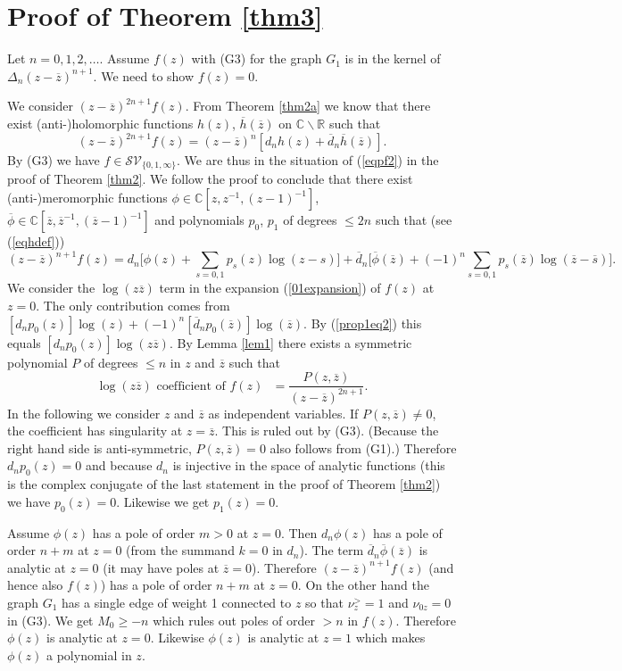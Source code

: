 \documentclass[oneside]{amsart}
\newcommand{\CC}{{\mathbb C}}
\newcommand{\RR}{{\mathbb R}}
\newcommand{\ddd}{{\overline{d}}}
\newcommand{\hh}{{\overline{h}}}
\newcommand{\sss}{{\overline{s}}}
\newcommand{\zz}{{\overline{z}}}
\newcommand{\sS}{\mathcal{S}}
\newcommand{\sV}{\mathcal{V}}
\theoremstyle{plain}
\begin{document}
\section{Proof of Theorem \ref{thm3}}\label{sectpf3}
Let $n=0,1,2,\ldots$. Assume $f(z)$ with (G3) for the graph $G_1$ is in the kernel of $\Delta_n(z-\zz)^{n+1}$. We need to show $f(z)=0$.

We consider $(z-\zz)^{2n+1}f(z)$. From Theorem \ref{thm2a} we know that there exist (anti-)holomorphic functions $h(z)$, $\hh(\zz)$ on $\CC\backslash\RR$ such that
\begin{equation}\label{pf3eq}
(z-\zz)^{2n+1}f(z)=(z-\zz)^n[d_nh(z)+\ddd_n\hh(\zz)].
\end{equation}
By (G3) we have $f\in\sS\sV_{\{0,1,\infty\}}$. We are thus in the situation of (\ref{eqpf2}) in the proof of Theorem \ref{thm2}.
We follow the proof to conclude that there exist (anti-)meromorphic functions $\phi\in\CC[z,z^{-1},(z-1)^{-1}]$, $\overline{\phi}\in\CC[\zz,\zz^{-1},(\zz-1)^{-1}]$
and polynomials $p_0$, $p_1$ of degrees $\leq2n$ such that (see (\ref{eqhdef}))
$$
(z-\zz)^{n+1}f(z)=d_n\Big[\phi(z)+\sum_{s=0,1}p_s(z)\log(z-s)\Big]+\ddd_n\Big[\overline{\phi}(\zz)+(-1)^n\sum_{s=0,1}p_s(\zz)\log(\zz-\sss)\Big].
$$
We consider the $\log(z\zz)$ term in the expansion (\ref{01expansion}) of $f(z)$ at $z=0$. The only contribution comes from
$[d_np_0(z)]\log(z)+(-1)^n[\ddd_np_0(\zz)]\log(\zz)$. By (\ref{prop1eq2}) this equals $[d_np_0(z)]\log(z\zz)$.
By Lemma \ref{lem1} there exists a symmetric polynomial $P$ of degrees $\leq n$ in $z$ and $\zz$ such that
$$
\text{$\log(z\zz)$ coefficient of $f(z)$ }=\frac{P(z,\zz)}{(z-\zz)^{2n+1}}.
$$
In the following we consider $z$ and $\zz$ as independent variables. If $P(z,\zz)\neq0$, the coefficient has singularity at $z=\zz$. This is ruled out by (G3).
(Because the right hand side is anti-symmetric, $P(z,\zz)=0$ also follows from (G1).)
Therefore $d_np_0(z)=0$ and because $d_n$ is injective in the space of analytic functions (this is the complex conjugate of the last statement in the proof
of Theorem \ref{thm2}) we have $p_0(z)=0$. Likewise we get $p_1(z)=0$.

Assume $\phi(z)$ has a pole of order $m>0$ at $z=0$. Then $d_n\phi(z)$ has a pole of order $n+m$ at $z=0$ (from the summand $k=0$ in $d_n$).
The term $\ddd_n\overline{\phi}(\zz)$ is analytic at $z=0$ (it may have poles at $\zz=0$). Therefore $(z-\zz)^{n+1}f(z)$ (and hence also $f(z)$) has a pole of order $n+m$ at $z=0$.
On the other hand the graph $G_1$ has a single edge of weight 1 connected to $z$ so that $\nu_z^>=1$ and $\nu_{0z}=0$ in (G3).
We get $M_0\geq-n$ which rules out poles of order $>n$ in $f(z)$. Therefore $\phi(z)$ is analytic at $z=0$. Likewise $\phi(z)$ is analytic at $z=1$ which makes $\phi(z)$ a polynomial in $z$.
\end{document}
